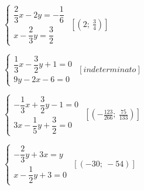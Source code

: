 \begin{esercizio}[\Ast]
\begin{multicols}{2}
\begin{enumeratea}
{\longarray
\item 
$\left\{\begin{array}{l}\dfrac{2}{3}x-2y=-{\dfrac{1}{6}}\\x-\dfrac{2}{3}
y=\dfrac{3}{2} \end{array}\right.$
 \hfill $\left[\left(2;~\frac{3}{4}\right)\right]$
\item $\left\{\begin{array}{l}\dfrac{1}{3}x-\dfrac{3}{2}y+1=0\\9y-2x-6=0 
\end{array}\right.$
 \hfill $\left[indeterminato\right]$
\item 
$\left\{\begin{array}{l}-{\dfrac{1}{3}}x+\dfrac{3}{2}y-1=0\\3x-\dfrac{1}{5}
y+\dfrac{3}{2}=0 \end{array}\right.$
 \hfill $\left[(-{\frac{123}{266}};~\frac{75}{133})\right]$
\item $\left\{\begin{array}{l}-{\dfrac{2}{3}}y+3x=y\\x-\dfrac{1}{2}y+3=0 
\end{array}\right.$
 \hfill $\left[(-30;~-54)\right]$}
\end{enumeratea}
\end{multicols}
\end{esercizio}

